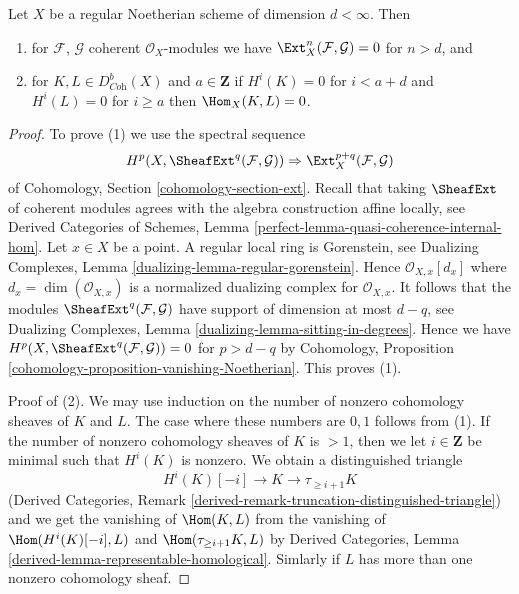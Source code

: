 \begin{lemma}
\label{lemma-Ext-0-regular}
Let $X$ be a regular Noetherian scheme of dimension $d < \infty$. Then
\begin{enumerate}
\item for $\mathcal{F}$, $\mathcal{G}$ coherent $\mathcal{O}_X$-modules
we have $\Ext^n_X(\mathcal{F}, \mathcal{G}) = 0$ for $n > d$, and
\item for $K, L \in D^b_{\textit{Coh}}(X)$ and $a \in \mathbf{Z}$
if $H^i(K) = 0$ for $i < a + d$ and $H^i(L) = 0$ for $i \geq a$ then
$\Hom_X(K, L) = 0$.
\end{enumerate}
\end{lemma}

\begin{proof}
To prove (1) we use the spectral sequence
$$
H^p(X, \SheafExt^q(\mathcal{F}, \mathcal{G})) \Rightarrow
\Ext^{p + q}_X(\mathcal{F}, \mathcal{G})
$$
of Cohomology, Section \ref{cohomology-section-ext}. Recall that
taking $\SheafExt$ of coherent modules agrees with the algebra
construction affine locally, see
Derived Categories of Schemes, Lemma
\ref{perfect-lemma-quasi-coherence-internal-hom}.
Let $x \in X$ be a point. A regular local ring is Gorenstein, see
Dualizing Complexes, Lemma \ref{dualizing-lemma-regular-gorenstein}.
Hence $\mathcal{O}_{X, x}[d_x]$ where $d_x = \dim(\mathcal{O}_{X, x})$
is a normalized dualizing complex for $\mathcal{O}_{X, x}$. It follows that
the modules $\SheafExt^q(\mathcal{F}, \mathcal{G})$ have support
of dimension at most $d - q$, see
Dualizing Complexes, Lemma \ref{dualizing-lemma-sitting-in-degrees}.
Hence we have
$H^p(X, \SheafExt^q(\mathcal{F}, \mathcal{G})) = 0$ for $p > d - q$
by Cohomology, Proposition \ref{cohomology-proposition-vanishing-Noetherian}.
This proves (1).

\medskip\noindent
Proof of (2).
We may use induction on the number of nonzero cohomology sheaves
of $K$ and $L$. The case where these numbers are $0, 1$ follows
from (1). If the number of nonzero cohomology sheaves of $K$
is $> 1$, then we let $i \in \mathbf{Z}$ be minimal such that
$H^i(K)$ is nonzero. We obtain a distinguished triangle
$$
H^i(K)[-i] \to K \to \tau_{\geq i + 1}K
$$
(Derived Categories, Remark
\ref{derived-remark-truncation-distinguished-triangle})
and we get the vanishing of $\Hom(K, L)$ from the vanishing
of $\Hom(H^i(K)[-i], L)$ and $\Hom(\tau_{\geq i + 1}K, L)$
by Derived Categories, Lemma \ref{derived-lemma-representable-homological}.
Simlarly if $L$ has more than one nonzero cohomology sheaf.
\end{proof}

